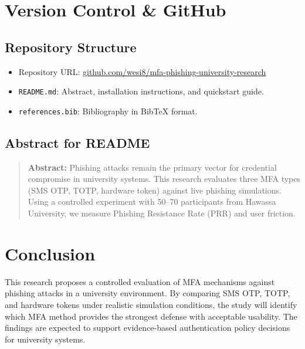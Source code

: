\documentclass[11pt]{article}
\begin{document}
\section{Version Control \& GitHub}

\subsection{Repository Structure}
\begin{itemize}
    \item Repository URL: \href{https://github.com/wesi8/mfa-phishing-university-research}{github.com/wesi8/mfa-phishing-university-research}
    \item \texttt{README.md}: Abstract, installation instructions, and quickstart guide.
    \item \texttt{references.bib}: Bibliography in BibTeX format.
\end{itemize}

\subsection{Abstract for README}
\begin{quote}
\textbf{Abstract:} Phishing attacks remain the primary vector for credential compromise in university systems. This research evaluates three MFA types (SMS OTP, TOTP, hardware token) against live phishing simulations. Using a controlled experiment with 50--70 participants from Hawassa University, we measure Phishing Resistance Rate (PRR) and user friction.
\end{quote}

\section{Conclusion}

This research proposes a controlled evaluation of MFA mechanisms against phishing attacks in a university environment. By comparing SMS OTP, TOTP, and hardware tokens under realistic simulation conditions, the study will identify which MFA method provides the strongest defense with acceptable usability. The findings are expected to support evidence-based authentication policy decisions for university systems.
\end{document}
